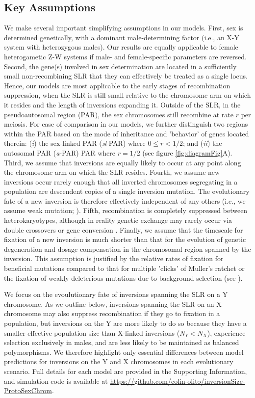 \documentclass{article}[12pt]
\begin{document}
\subsection*{Key Assumptions} \label{sec:assumptions}
We make several important simplifying assumptions in our models. First, sex is determined genetically, with a dominant male-determining factor (i.e., an X-Y system with heterozygous males). Our results are equally applicable to female heterogametic Z-W systems if male- and female-specific parameters are reversed. Second, the gene(s) involved in sex determination are located in a sufficiently small non-recombining SLR that they can effectively be treated as a single locus. Hence, our models are most applicable to the early stages of recombination suppression, when the SLR is still small relative to the chromosome arm on which it resides and the length of inversions expanding it. Outside of the SLR, in the pseudoautosomal region (PAR), the sex chromosomes still recombine at rate $r$ per meiosis. For ease of comparison in our models, we further distinguish two regions within the PAR based on the mode of inheritance and 'behavior' of genes located therein: ({\itshape i}) the sex-linked PAR ({\itshape sl}-PAR) where $0 \leq r < 1/2$; and ({\itshape ii}) the autosomal PAR ({\itshape a}-PAR) PAR where $r = 1/2$ (see figure \ref{fig:diagramFig}A). Third, we assume that inversions are equally likely to occur at any point along the chromosome arm on which the SLR resides. Fourth, we assume new inversions occur rarely enough that all inverted chromosomes segregating in a population are descendent copies of a single inversion mutation. The evolutionary fate of a new inversion is therefore effectively independent of any others (i.e., we assume weak mutation; \citealt{Gillespie1991}). Fifth, recombination is completely suppressed between heterokaryotypes, although in reality genetic exchange may rarely occur via double crossovers or gene conversion \citep{KrimbasPowell1992, KorunesNoor2019}. Finally, we assume that the timescale for fixation of a new inversion is much shorter than that for the evolution of genetic degeneration and dosage compensation in the chromosomal region spanned by the inversion. This assumption is justified by the relative rates of fixation for beneficial mutations compared to that for multiple 'clicks' of Muller's ratchet or the fixation of weakly deleterious mutations due to background selection (see \citealt{Charlesworth2000, Bachtrog2008}).

We focus on the evoulutionary fate of inversions spanning the SLR on a Y chromosome. As we outline below, inversions spanning the SLR on an X chromosome may also suppress recombination if they go to fixation in a population, but inversions on the Y are more likely to do so because they have a smaller effective population size than X-linked inversions ($N_Y < N_X$), experience selection exclusively in males, and are less likely to be maintained as balanced polymorphisms. We therefore highlight only essential differences between model predictions for inversions on the Y and X chromosomes in each evolutionary scenario. Full details for each model are provided in the Supporting Information, and simulation code is available at \url{https://github.com/colin-olito/inversionSize-ProtoSexChrom}.
\end{document}
